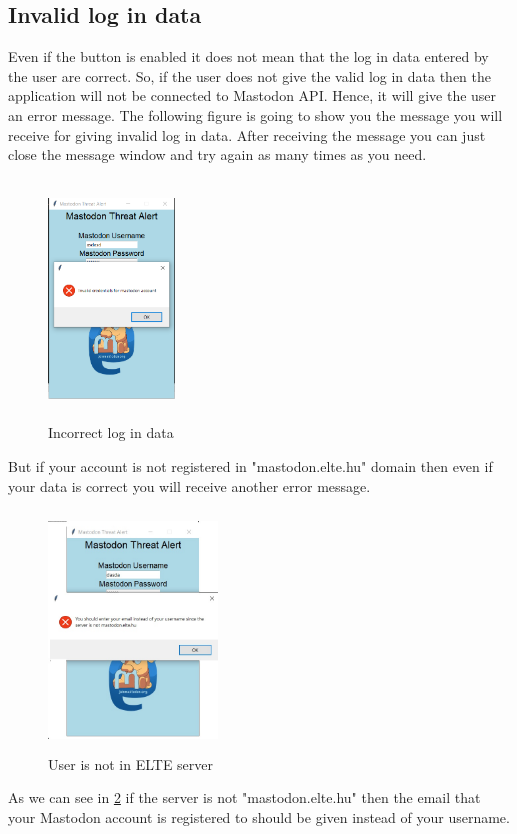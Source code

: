 \subsection{Invalid log in data}
\label{ss:incorrect_data}
Even if the button is enabled it does not mean that the log in data entered by the user
are correct. So, if the user does not give the valid log in data then the application 
will not be connected to Mastodon API. Hence, it will give the user an error message.
The following figure is going to show you the message you will receive for giving invalid 
log in data. After receiving the message you can just close the message window and try again
as many times as you need.
\begin{figure}[H]
	\centering
	\includegraphics[width=0.3\textwidth,height=240px]{images/invalidred.png}
	\caption{Incorrect log in data}
	\label{fig:invalid_data}
\end{figure}
But if your account is not registered in "mastodon.elte.hu" domain then
even if your data is correct you will receive another error message.
\begin{figure}[H]
	\centering
	\includegraphics[width=0.4\textwidth,height=240px]{images/notelteserver3.jpg}
	\caption{User is not in ELTE server}
	\label{fig:not_elte}
\end{figure}
As we can see in \ref{fig:not_elte} if the server is not "mastodon.elte.hu" then
the email that your Mastodon account is registered to should be given instead of
your username.

